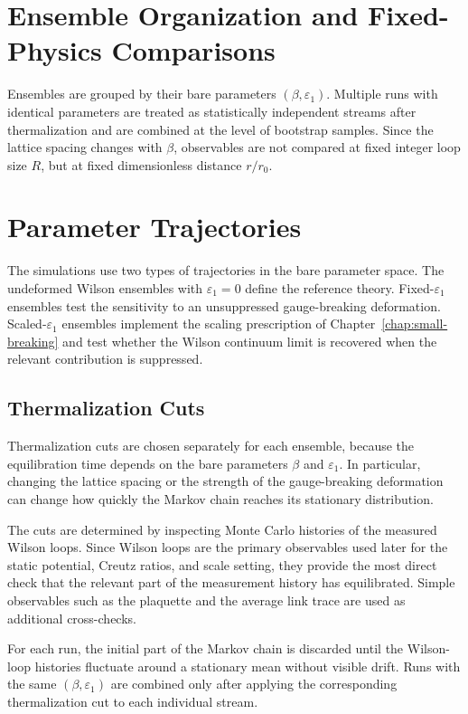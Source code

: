 \documentclass[12pt,a4paper,oneside,numbers=noenddot]{scrreprt}
\newcommand{\eps}{\varepsilon}
\begin{document}
\section{Ensemble Organization and Fixed-Physics Comparisons}
Ensembles are grouped by their bare parameters \((\beta,\eps_1)\). Multiple
runs with identical parameters are treated as statistically independent streams
after thermalization and are combined at the level of bootstrap samples. Since
the lattice spacing changes with \(\beta\), observables are not compared at fixed
integer loop size \(R\), but at fixed dimensionless distance \(r/r_0\).

\section{Parameter Trajectories}
The simulations use two types of trajectories in the bare parameter space.
The undeformed Wilson ensembles with \(\eps_1=0\) define the reference theory.
Fixed-\(\eps_1\) ensembles test the sensitivity to an unsuppressed
gauge-breaking deformation. Scaled-\(\eps_1\) ensembles implement the scaling
prescription of Chapter~\ref{chap:small-breaking} and test whether the Wilson
continuum limit is recovered when the relevant contribution is suppressed.

\subsection{Thermalization Cuts}
\label{subsec:thermalization-cuts}

Thermalization cuts are chosen separately for each ensemble, because the
equilibration time depends on the bare parameters \(\beta\) and \(\eps_1\).
In particular, changing the lattice spacing or the strength of the
gauge-breaking deformation can change how quickly the Markov chain reaches its
stationary distribution.

The cuts are determined by inspecting Monte Carlo histories of the measured
Wilson loops. Since Wilson loops are the primary observables used later for the
static potential, Creutz ratios, and scale setting, they provide the most
direct check that the relevant part of the measurement history has equilibrated.
Simple observables such as the plaquette and the average link trace are used as
additional cross-checks.

For each run, the initial part of the Markov chain is discarded until the
Wilson-loop histories fluctuate around a stationary mean without visible drift.
Runs with the same \((\beta,\eps_1)\) are combined only after applying the
corresponding thermalization cut to each individual stream.
\end{document}
